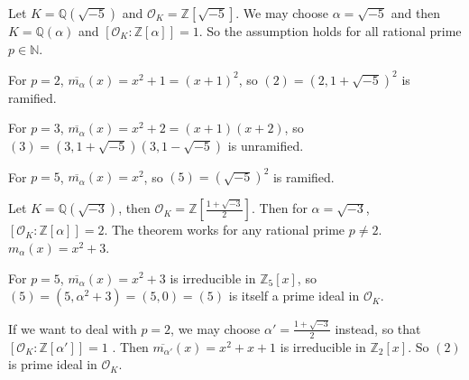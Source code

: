\begin{example}
    Let $K=\mathbb{Q}(\sqrt{-5})$ and $\mathcal{O}_{K}=\mathbb{Z}[\sqrt{-5}]$. We may choose $\alpha=\sqrt{-5}$ and then $K=\mathbb{Q}(\alpha)$ and $[\mathcal{O}_{K}:\mathbb{Z}[\alpha]]=1$. So the assumption holds for all rational prime $p\in \mathbb{N}$. 

    For $p=2$, $\overline{m_{\alpha}}(x)=x^{2}+1=(x+1)^{2}$, so $(2)=(2,1+\sqrt{-5})^{2}$ is ramified. 

    For $p=3$, $\overline{m_{\alpha}}(x)=x^{2}+2=(x+1)(x+2)$, so $(3)=(3,1+\sqrt{-5})(3,1-\sqrt{-5})$ is unramified. 

    For $p=5$, $\overline{m_{\alpha}}(x)=x^{2}$, so $(5)=(\sqrt{-5})^{2}$ is ramified. 
\end{example}

\begin{example}
    Let $K=\mathbb{Q}(\sqrt{-3})$, then $\mathcal{O}_{K}=\mathbb{Z}[\frac{1+\sqrt{-3}}{2}]$. Then for $\alpha=\sqrt{-3}$, $[\mathcal{O}_{K}:\mathbb{Z}[\alpha]]=2$. The theorem works for any rational prime $p\neq 2$. $m_{\alpha}(x)=x^{2}+3$. 

    For $p=5$, $\overline{m_{\alpha}}(x)=x^{2}+3$ is irreducible in $\mathbb{Z}_{5}[x]$, so $(5) = (5, \alpha^2+3) = (5,0) = (5)$ is itself a prime ideal in $\mathcal{O}_{K}$. 

    If we want to deal with $p=2$, we may choose $\alpha'=\frac{1+\sqrt{-3}}{2}$ instead, so that $[\mathcal{O}_K : \mathbb{Z}[\alpha']] = 1$ . Then $\overline{m_{\alpha'}}(x)=x^{2}+x+1$ is irreducible in $\mathbb{Z}_{2}[x]$. So $(2)$ is prime ideal in $\mathcal{O}_{K}$. 
\end{example}

